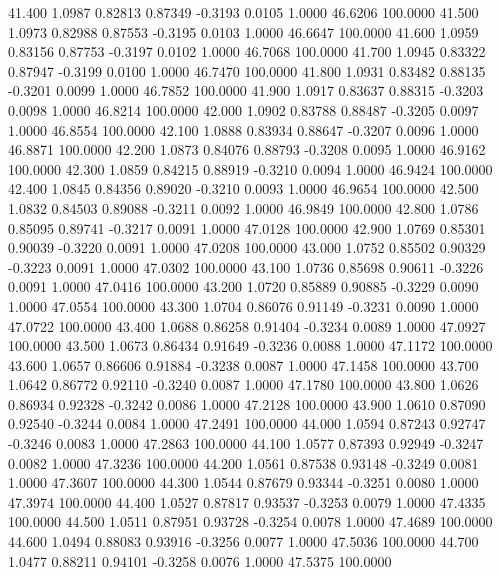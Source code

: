   41.400   1.0987   0.82813   0.87349  -0.3193   0.0105   1.0000  46.6206 100.0000
  41.500   1.0973   0.82988   0.87553  -0.3195   0.0103   1.0000  46.6647 100.0000
  41.600   1.0959   0.83156   0.87753  -0.3197   0.0102   1.0000  46.7068 100.0000
  41.700   1.0945   0.83322   0.87947  -0.3199   0.0100   1.0000  46.7470 100.0000
  41.800   1.0931   0.83482   0.88135  -0.3201   0.0099   1.0000  46.7852 100.0000
  41.900   1.0917   0.83637   0.88315  -0.3203   0.0098   1.0000  46.8214 100.0000
  42.000   1.0902   0.83788   0.88487  -0.3205   0.0097   1.0000  46.8554 100.0000
  42.100   1.0888   0.83934   0.88647  -0.3207   0.0096   1.0000  46.8871 100.0000
  42.200   1.0873   0.84076   0.88793  -0.3208   0.0095   1.0000  46.9162 100.0000
  42.300   1.0859   0.84215   0.88919  -0.3210   0.0094   1.0000  46.9424 100.0000
  42.400   1.0845   0.84356   0.89020  -0.3210   0.0093   1.0000  46.9654 100.0000
  42.500   1.0832   0.84503   0.89088  -0.3211   0.0092   1.0000  46.9849 100.0000
  42.800   1.0786   0.85095   0.89741  -0.3217   0.0091   1.0000  47.0128 100.0000
  42.900   1.0769   0.85301   0.90039  -0.3220   0.0091   1.0000  47.0208 100.0000
  43.000   1.0752   0.85502   0.90329  -0.3223   0.0091   1.0000  47.0302 100.0000
  43.100   1.0736   0.85698   0.90611  -0.3226   0.0091   1.0000  47.0416 100.0000
  43.200   1.0720   0.85889   0.90885  -0.3229   0.0090   1.0000  47.0554 100.0000
  43.300   1.0704   0.86076   0.91149  -0.3231   0.0090   1.0000  47.0722 100.0000
  43.400   1.0688   0.86258   0.91404  -0.3234   0.0089   1.0000  47.0927 100.0000
  43.500   1.0673   0.86434   0.91649  -0.3236   0.0088   1.0000  47.1172 100.0000
  43.600   1.0657   0.86606   0.91884  -0.3238   0.0087   1.0000  47.1458 100.0000
  43.700   1.0642   0.86772   0.92110  -0.3240   0.0087   1.0000  47.1780 100.0000
  43.800   1.0626   0.86934   0.92328  -0.3242   0.0086   1.0000  47.2128 100.0000
  43.900   1.0610   0.87090   0.92540  -0.3244   0.0084   1.0000  47.2491 100.0000
  44.000   1.0594   0.87243   0.92747  -0.3246   0.0083   1.0000  47.2863 100.0000
  44.100   1.0577   0.87393   0.92949  -0.3247   0.0082   1.0000  47.3236 100.0000
  44.200   1.0561   0.87538   0.93148  -0.3249   0.0081   1.0000  47.3607 100.0000
  44.300   1.0544   0.87679   0.93344  -0.3251   0.0080   1.0000  47.3974 100.0000
  44.400   1.0527   0.87817   0.93537  -0.3253   0.0079   1.0000  47.4335 100.0000
  44.500   1.0511   0.87951   0.93728  -0.3254   0.0078   1.0000  47.4689 100.0000
  44.600   1.0494   0.88083   0.93916  -0.3256   0.0077   1.0000  47.5036 100.0000
  44.700   1.0477   0.88211   0.94101  -0.3258   0.0076   1.0000  47.5375 100.0000

